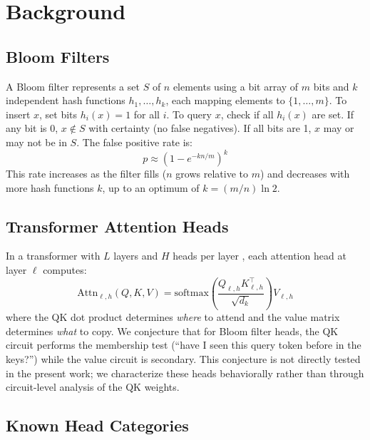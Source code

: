 \documentclass[11pt]{article}
\begin{document}
\section{Background}

\subsection{Bloom Filters}

A Bloom filter \citep{bloom1970space} represents a set $S$ of $n$ elements using a bit array of $m$ bits and $k$ independent hash functions $h_1, \ldots, h_k$, each mapping elements to $\{1, \ldots, m\}$. To insert $x$, set bits $h_i(x) = 1$ for all $i$. To query $x$, check if all $h_i(x)$ are set. If any bit is 0, $x \notin S$ with certainty (no false negatives). If all bits are 1, $x$ may or may not be in $S$. The false positive rate is:
\begin{equation}
    p \approx \left(1 - e^{-kn/m}\right)^k
    \label{eq:bloom_fp}
\end{equation}
This rate increases as the filter fills ($n$ grows relative to $m$) and decreases with more hash functions $k$, up to an optimum of $k = (m/n) \ln 2$.

\subsection{Transformer Attention Heads}

In a transformer with $L$ layers and $H$ heads per layer \citep{vaswani2017attention}, each attention head at layer $\ell$ computes:
\begin{equation}
    \text{Attn}_{\ell,h}(Q, K, V) = \text{softmax}\left(\frac{Q_{\ell,h} K_{\ell,h}^\top}{\sqrt{d_k}}\right) V_{\ell,h}
\end{equation}
where the QK dot product determines \emph{where} to attend and the value matrix determines \emph{what} to copy. We conjecture that for Bloom filter heads, the QK circuit performs the membership test (``have I seen this query token before in the keys?'') while the value circuit is secondary. This conjecture is not directly tested in the present work; we characterize these heads behaviorally rather than through circuit-level analysis of the QK weights.

\subsection{Known Head Categories}
\end{document}
